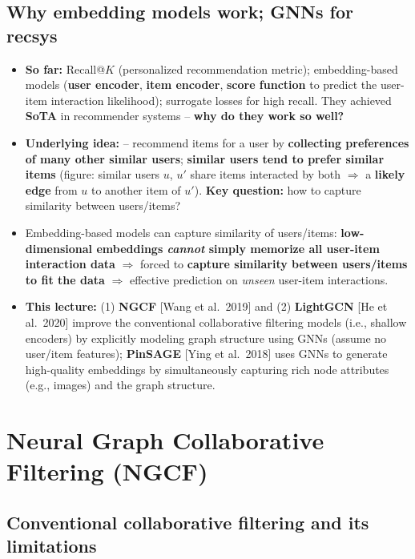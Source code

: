 \subsection{Why embedding models work; GNNs for recsys}\label{sec:lec11-why}

\begin{itemize}
  \item \textbf{So far:} Recall@$K$ (personalized recommendation metric);
    embedding-based models (\textbf{user encoder}, \textbf{item encoder},
    \textbf{score function} to predict the user-item interaction likelihood);
    surrogate losses for high recall. They achieved \textbf{SoTA} in
    recommender systems -- \textbf{why do they work so well?}
  \item \textbf{Underlying idea:}  -- recommend
    items for a user by \textbf{collecting preferences of many other similar
    users}; \textbf{similar users tend to prefer similar items} (figure:
    similar users $u$, $u'$ share items interacted by both $\Rightarrow$ a
    \textbf{likely edge} from $u$ to another item of $u'$). \textbf{Key
    question:} how to capture similarity between users/items?
  \item Embedding-based models can capture similarity of users/items:
    \textbf{low-dimensional embeddings \emph{cannot} simply memorize all
    user-item interaction data} $\Rightarrow$ forced to \textbf{capture
    similarity between users/items to fit the data} $\Rightarrow$ effective
    prediction on \emph{unseen} user-item interactions.
  \item \textbf{This lecture:} (1) \textbf{NGCF} [Wang et al.\ 2019] and (2)
    \textbf{LightGCN} [He et al.\ 2020] improve the conventional collaborative
    filtering models (i.e., shallow encoders) by explicitly modeling graph
    structure using GNNs (assume no user/item features); \textbf{PinSAGE}
    [Ying et al.\ 2018] uses GNNs to generate high-quality embeddings by
    simultaneously capturing rich node attributes (e.g., images) and the graph
    structure.
\end{itemize}

\section{Neural Graph Collaborative Filtering (NGCF)}\label{sec:lec11-ngcf}

\subsection{Conventional collaborative filtering and its limitations}\label{sec:lec11-cf}

